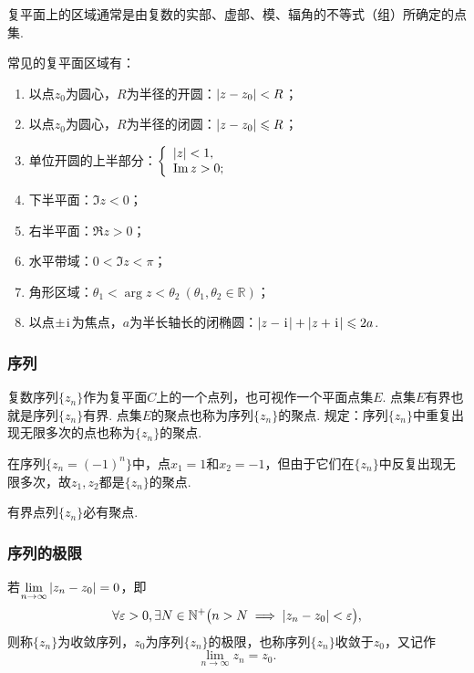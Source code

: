 复平面上的区域通常是由复数的实部、虚部、模、辐角的不等式（组）所确定的点集.
\begin{example}
常见的复平面区域有：\begin{enumerate}
\item 以点\(z_0\)为圆心，\(R\)为半径的开圆：\(\abs{z-z_0}<R\)；
\item 以点\(z_0\)为圆心，\(R\)为半径的闭圆：\(\abs{z-z_0} \leqslant R\)；
\item 单位开圆的上半部分：\(\left\{ \begin{array}{l}
\abs{z}<1, \\
\Im z > 0;
\end{array} \right.\)
\item 下半平面：\(\Im z < 0\)；
\item 右半平面：\(\Re z > 0\)；
\item 水平带域：\(0 < \Im z < \pi\)；
\item 角形区域：\(\theta_1 < \arg z < \theta_2\ (\theta_1,\theta_2\in\mathbb{R})\)；
\item 以点\(\pm\kern1pt\mathrm{i}\kern1pt\)为焦点，\(a\)为半长轴长的闭椭圆：\(\abs{z-\kern1pt\mathrm{i}\kern1pt}+\abs{z+\kern1pt\mathrm{i}\kern1pt}\leqslant2a\).
\end{enumerate}
\end{example}

\subsubsection{序列}
\begin{definition}
复数序列\(\{z_n\}\)作为复平面\(C\)上的一个点列，也可视作一个平面点集\(E\).
点集\(E\)有界也就是序列\(\{z_n\}\)有界.
点集\(E\)的聚点也称为序列\(\{z_n\}\)的聚点.
规定：序列\(\{z_n\}\)中重复出现无限多次的点也称为\(\{z_n\}\)的聚点.
\end{definition}

\begin{example}
在序列\(\{z_n = (-1)^n\}\)中，点\(x_1=1\)和\(x_2=-1\)，但由于它们在\(\{z_n\}\)中反复出现无限多次，故\(z_1,z_2\)都是\(\{z_n\}\)的聚点.
\end{example}

\begin{theorem}\label{theorem:复变函数.BW定理}
有界点列\(\{z_n\}\)必有聚点.
\end{theorem}

\subsubsection{序列的极限}
\begin{definition}
若\(\lim\limits_{n \to \infty} \abs{z_n - z_0} = 0\)，即\[
\forall \varepsilon > 0, \exists N \in \mathbb{N}^+ \bigl(
n > N \implies \abs{z_n - z_0} < \varepsilon
\bigr),
\]则称\(\{z_n\}\)为收敛序列，\(z_0\)为序列\(\{z_n\}\)的极限，也称序列\(\{z_n\}\)收敛于\(z_0\)，又记作\[
\lim\limits_{n \to \infty} z_n = z_0.
\]
\end{definition}

